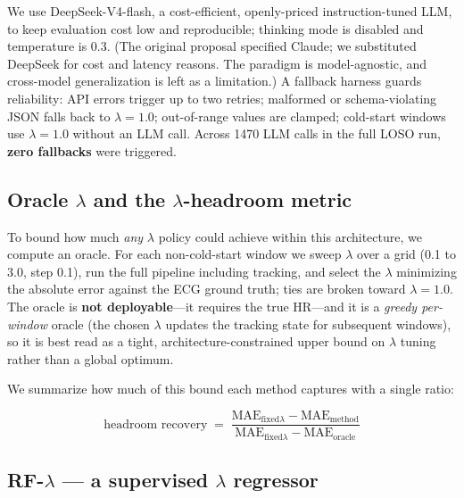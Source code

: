 \documentclass[sigconf,nonacm,11pt]{acmart}
\begin{document}
We use DeepSeek-V4-flash, a cost-efficient, openly-priced instruction-tuned LLM, to keep evaluation cost low and reproducible; thinking mode is disabled and temperature is 0.3. (The original proposal specified Claude; we substituted DeepSeek for cost and latency reasons. The paradigm is model-agnostic, and cross-model generalization is left as a limitation.) A fallback harness guards reliability: API errors trigger up to two retries; malformed or schema-violating JSON falls back to $\lambda = 1.0$; out-of-range values are clamped; cold-start windows use $\lambda = 1.0$ without an LLM call. Across 1470 LLM calls in the full LOSO run, \textbf{zero fallbacks} were triggered.

\subsection{Oracle $\lambda$ and the $\lambda$-headroom metric}

To bound how much \emph{any} $\lambda$ policy could achieve within this architecture, we compute an oracle. For each non-cold-start window we sweep $\lambda$ over a grid (0.1 to 3.0, step 0.1), run the full pipeline including tracking, and select the $\lambda$ minimizing the absolute error against the ECG ground truth; ties are broken toward $\lambda = 1.0$. The oracle is \textbf{not deployable}---it requires the true HR---and it is a \emph{greedy per-window} oracle (the chosen $\lambda$ updates the tracking state for subsequent windows), so it is best read as a tight, architecture-constrained upper bound on $\lambda$ tuning rather than a global optimum.

We summarize how much of this bound each method captures with a single ratio:

\begin{equation}
\text{headroom recovery} \;=\; \frac{\text{MAE}_{\text{fixed}\lambda} - \text{MAE}_{\text{method}}}{\text{MAE}_{\text{fixed}\lambda} - \text{MAE}_{\text{oracle}}}
\end{equation}

\subsection{RF-$\lambda$ --- a supervised $\lambda$ regressor}
\end{document}
